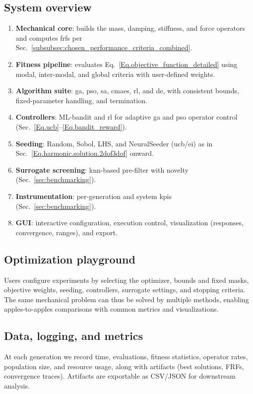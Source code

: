 \documentclass[12pt,a4paper]{article}
\begin{document}
\subsection{System overview}
\begin{enumerate}
    \item \textbf{Mechanical core}: builds the mass, damping, stiffness, and force operators and computes \gls{frf}s per Sec.~\ref{subsubsec:chosen_performance_criteria_combined}.
    \item \textbf{Fitness pipeline}: evaluates Eq.~\eqref{Eq.objective_function_detailed} using modal, inter-modal, and global criteria with user-defined weights.
    \item \textbf{Algorithm suite}: \gls{ga}, \gls{pso}, \gls{sa}, \gls{cmaes}, \gls{rl}, and \gls{de}, with consistent bounds, fixed-parameter handling, and termination.
    \item \textbf{Controllers}: ML-bandit and \gls{rl} for adaptive \gls{ga} and \gls{pso} operator control (Sec.~\ref{Eq.ucb}--\ref{Eq.bandit_reward}).
    \item \textbf{Seeding}: Random, Sobol, LHS, and NeuralSeeder (\gls{ucb}/\gls{ei}) as in Sec.~\ref{Eq.harmonic.solution.2dof3dof} onward.
    \item \textbf{Surrogate screening}: \gls{knn}-based pre-filter with novelty (Sec.~\ref{sec:benchmarking}).
    \item \textbf{Instrumentation}: per-generation and system \gls{kpi}s (Sec.~\ref{sec:benchmarking}).
    \item \textbf{GUI}: interactive configuration, execution control, visualization (responses, convergence, ranges), and export.
\end{enumerate}

\subsection{Optimization playground}
Users configure experiments by selecting the optimizer, bounds and fixed masks, objective weights, seeding, controllers, surrogate settings, and stopping criteria. The same mechanical problem can thus be solved by multiple methods, enabling apples-to-apples comparisons with common metrics and visualizations.

\subsection{Data, logging, and metrics}
At each generation we record time, evaluations, fitness statistics, operator rates, population size, and resource usage, along with artifacts (best solutions, FRFs, convergence traces). Artifacts are exportable as CSV/JSON for downstream analysis.
\end{document}
